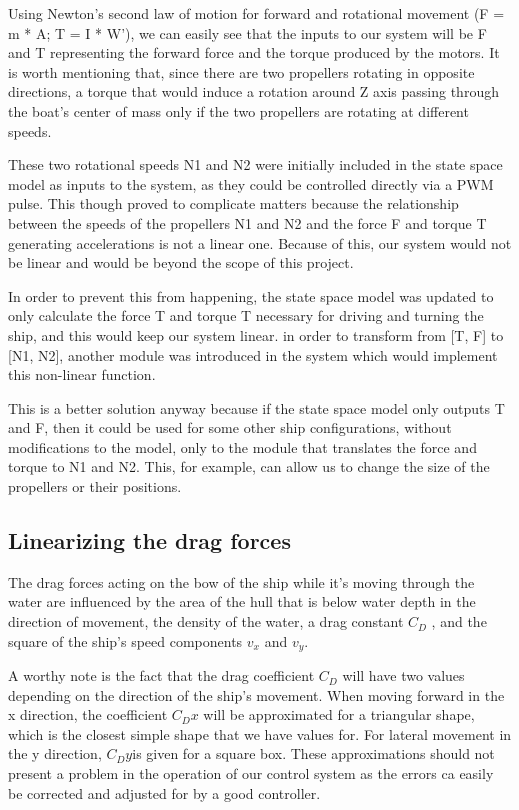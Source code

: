 Using Newton's second law of motion for forward  and rotational movement (F = m * A; T = I * W'), we can easily see that the inputs to our system will be F and T representing the forward force and the torque produced by the motors. It is worth mentioning that, since there are two propellers rotating in opposite directions, a torque that would induce a rotation around Z axis passing through the boat's center of mass only if the two propellers are rotating at different speeds.

These two rotational speeds N1 and N2 were initially included in the state space model as inputs to the system, as they could be controlled directly via a PWM pulse. This though proved to complicate matters because the relationship between the speeds of the propellers N1 and N2 and the force F and torque T generating accelerations is not a linear one. Because of this, our system would not be linear and would be beyond the scope of this project. 


In order to prevent this from happening, the state space model was updated to only calculate the force T and torque T necessary for driving and turning the ship, and this would keep our system linear. in order to transform from [T, F] to [N1, N2], another module was introduced in the system which would implement this non-linear function. 

This is a better solution anyway because if the state space model only outputs T and F, then it could be used for some other ship configurations, without modifications to the model, only to the module that translates the force and torque to N1 and N2. This, for example, can allow us to change the size of the propellers or their positions.

\subsection{Linearizing the drag forces}

The drag forces acting on the bow of the ship while it's moving through the water are influenced by the area of the hull that is below water depth in the direction of movement, the density of the water, a drag constant $ C_{D} $ , and the square of the ship's speed components $ v_{x} $ and $ v_{y} $. 

A worthy note is the fact that the drag coefficient $ C_{D} $ will have two values depending on the direction of the ship's movement. When moving forward in the x direction, the coefficient $ C_{D}x $ will be approximated for a triangular shape, which is the closest simple shape that we have values for. For lateral movement in the y direction, $ C_{D}y $is given for a square box. These approximations should not present a problem in the operation of our control system as the errors ca easily be corrected and adjusted for by a good controller.

